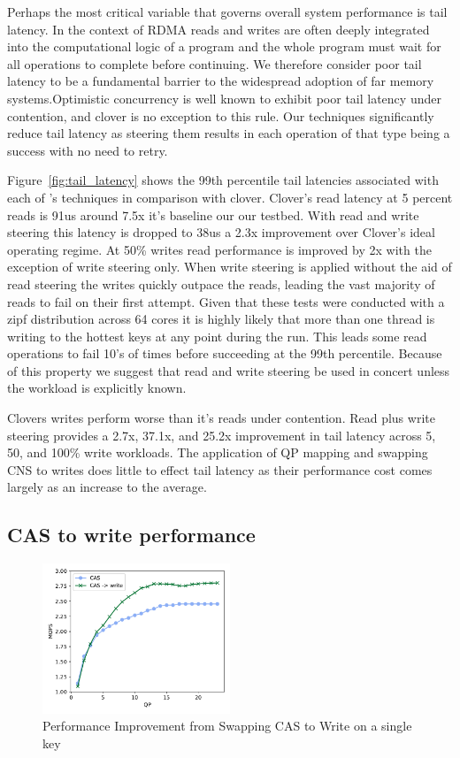 Perhaps the most critical variable that governs overall system performance is
tail latency. In the context of RDMA reads and writes are often deeply
integrated into the computational logic of a program and the whole program must
wait for all operations to complete before continuing. We therefore consider
poor tail latency to be a fundamental barrier to the widespread adoption of far
memory systems.Optimistic concurrency is well known to exhibit poor tail latency
under contention, and clover is no exception to this rule. Our techniques
significantly reduce tail latency as steering them results in each operation of
that type being a success with no need to retry.

Figure~\ref{fig:tail_latency} shows the 99th percentile tail latencies
associated with each of \sword's techniques in comparison with clover. Clover's
read latency at 5 percent reads is 91us around 7.5x it's baseline our our
testbed. With read and write steering this latency is dropped to 38us a 2.3x
improvement over Clover's ideal operating regime. At 50\% writes read
performance is improved by 2x with the exception of write steering only. When
write steering is applied without the aid of read steering the writes quickly
outpace the reads, leading the vast majority of reads to fail on their first
attempt. Given that these tests were conducted with a zipf distribution across
64 cores it is highly likely that more than one thread is writing to the hottest
keys at any point during the run. This leads some read operations to fail 10's
of times before succeeding at the 99th percentile. Because of this property we
suggest that read and write steering be used in concert unless the workload is
explicitly known.

Clovers writes perform worse than it's reads under contention. Read plus write
steering provides a 2.7x, 37.1x, and 25.2x improvement in tail latency across
5, 50, and 100\% write workloads. The application of QP mapping and swapping CNS
to writes does little to effect tail latency as their performance cost comes
largely as an increase to the average.


\subsection{CAS to write performance}

\begin{figure}
    \includegraphics[width=0.5\textwidth]{fig/cas_vs_swap.pdf}
    \caption{Performance Improvement from Swapping CAS to Write on a single key}
    \label{fig:cas_vs_swap}
\end{figure}

